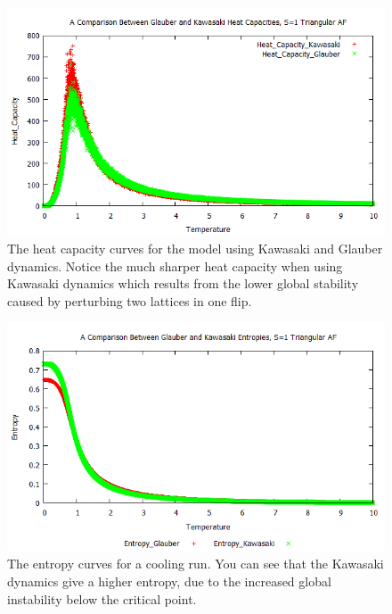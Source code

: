 \documentclass[]{article}
\begin{document}
\begin{figure}
\begin{center}
\includegraphics[scale=0.75]{Heat_Capacity}
\caption{The heat capacity curves for the model using Kawasaki and Glauber dynamics. Notice the much sharper heat capacity when using Kawasaki dynamics which results from the lower global stability caused by perturbing two lattices in one flip.}
\label{Heat_Capacity}
\end{center}
\end{figure}

\begin{figure}
\begin{center}
\includegraphics[scale=0.75]{Entropy}
\caption{The entropy curves for a cooling run. You can see that the Kawasaki dynamics give a higher entropy, due to the increased global instability below the critical point.}
\label{Entropy}
\end{center}
\end{figure}
\end{document}
